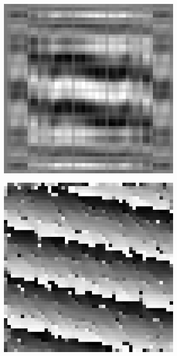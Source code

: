 \begin{figure}[htpb]
\begin{subfigure}{.25\textwidth}
\end{subfigure}%
\begin{subfigure}{.25\textwidth}
\includegraphics[width=1\textwidth]{img/CPSRank1sigma300}
\end{subfigure}
\quad
\begin{subfigure}{.25\textwidth}
\includegraphics[width=1\textwidth]{img/PhaseDifferenceSigma0}

\end{subfigure}
\end{figure}
